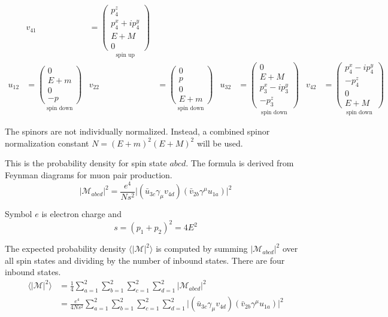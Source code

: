 \documentclass[12pt]{article}
\begin{document}
\begin{align*}
{}
&
v_{41}&=
\underset{\text{spin up}}
{
\begin{pmatrix}p_4^z\\p_4^x+ip_4^y\\E+M\\0\end{pmatrix}
}
\\[1ex]
u_{12}&=
\underset{\text{spin down}}
{
\begin{pmatrix}0\\E+m\\0\\-p\end{pmatrix}
}
&
v_{22}&=
\underset{\text{spin down}}
{
\begin{pmatrix}0\\p\\0\\E+m\end{pmatrix}
}
&
u_{32}&=
\underset{\text{spin down}}
{
\begin{pmatrix}0\\E+M\\p_3^x-ip_3^y\\-p_3^z\end{pmatrix}
}
&
v_{42}&=
\underset{\text{spin down}}
{
\begin{pmatrix}p_4^x-ip_4^y\\-p_4^z\\0\\E+M\end{pmatrix}
}
\end{align*}

The spinors are not individually normalized.
Instead, a combined spinor normalization constant $N=(E+m)^2(E+M)^2$ will be used.

\bigskip
This is the probability density for spin state $abcd$.
The formula is derived from Feynman diagrams for muon pair production.
\begin{equation*}
\big|\mathcal{M}_{abcd}\big|^2
=\frac{e^4}{Ns^2}\big|(\bar{u}_{3c}\gamma_\mu v_{4d})(\bar{v}_{2b}\gamma^\mu u_{1a})\big|^2
\end{equation*}

Symbol $e$ is electron charge and
\begin{equation*}
s=(p_1+p_2)^2=4E^2
\end{equation*}

The expected probability density $\langle|\mathcal{M}|^2\rangle$
is computed by summing $|\mathcal{M}_{abcd}|^2$ over all spin states
and dividing by the number of inbound states.
There are four inbound states.
\begin{align*}
\langle|\mathcal{M}|^2\rangle
&=\frac{1}{4}\sum_{a=1}^2\sum_{b=1}^2\sum_{c=1}^2\sum_{d=1}^2\big|\mathcal{M}_{abcd}\big|^2
\\
&=\frac{e^4}{4Ns^2}\sum_{a=1}^2\sum_{b=1}^2\sum_{c=1}^2\sum_{d=1}^2
\big|(\bar{u}_{3c}\gamma_\mu v_{4d})(\bar{v}_{2b}\gamma^\mu u_{1a})\big|^2
\end{align*}
\end{document}
